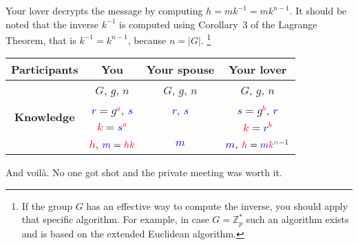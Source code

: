 Your lover decrypts the message by computing $h = m k^{-1} = m k^{n - 1}$. It should be noted that the inverse $k^{-1}$ is computed using Corollary~3 of the Lagrange Theorem, that is $k^{-1} = k^{n - 1}$, because $n = |G|$.%
\footnote{If the group $G$ has an effective way to compute the inverse, you should apply that specific algorithm. For example, in case $G = \mathbb Z_p^*$ such an algorithm exists and is based on the extended Euclidean algorithm.}
\begin{center}
\begin{tabular}{|c|c|c|c|}
\hline
{\bf Participants}&{You}&{Your spouse}&{Your lover}\\
\hline
\multirow{4}{*}{\bf Knowledge}&{\textcolor{OliveGreen}{$G$}, \textcolor{OliveGreen}{$g$}, \textcolor{OliveGreen}{$n$}}&{\textcolor{OliveGreen}{$G$}, \textcolor{OliveGreen}{$g$}, \textcolor{OliveGreen}{$n$}}&{\textcolor{OliveGreen}{$G$}, \textcolor{OliveGreen}{$g$}, \textcolor{OliveGreen}{$n$}}\\
{}&{ \textcolor{blue}{$r$}$=$\textcolor{OliveGreen}{$ g$}\textcolor{red}{${}^a$}, \textcolor{blue}{$s$}}&{\textcolor{blue}{$r$, $s$}}&{ \textcolor{blue}{$s$}$=$\textcolor{OliveGreen}{$g$}\textcolor{red}{${}^b$}, \textcolor{blue}{$r$}}\\
{}&{ \textcolor{red}{$k$}$=$\textcolor{blue}{$s$}\textcolor{red}{${}^a$}}&{}&{ \textcolor{red}{$k$}$=$\textcolor{blue}{$r$}\textcolor{red}{${}^b$}}\\
{}&{\textcolor{red}{$h$}, $\textcolor{blue}{m} = \textcolor{red}{hk}$}&{\textcolor{blue}{$m$}}&{\textcolor{blue}{$m$}, $\textcolor{red}{h} = \textcolor{blue}{m} \textcolor{red}{k}^{\textcolor{OliveGreen}{n}-1}$}\\
\hline
\end{tabular}
\end{center}

And voil\`a. No one got shot and the private meeting was worth it.

%



